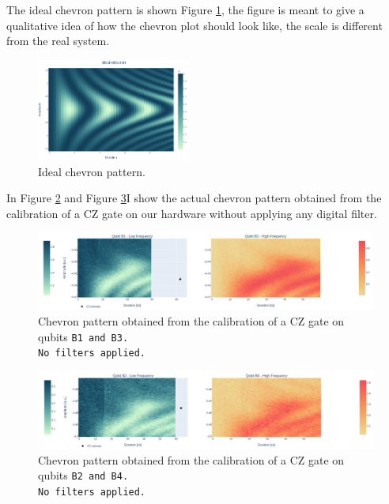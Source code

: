 The ideal chevron pattern is shown Figure \ref{fig:expected_chevron}, the figure is meant to give a qualitative idea of how the chevron plot should look like, the scale is different from the real system.

\begin{figure}[h!]
    \centering
    \includegraphics[width=0.45\textwidth]{figures/png/IdealChevron.png}
    \caption{Ideal chevron pattern.}
    \label{fig:expected_chevron}
\end{figure}

\newpage
{}
In Figure \ref{fig:B1B3_nofilter} and Figure \ref{fig:B2B4_nofilter}I show the actual chevron pattern obtained from the calibration of a CZ gate on our hardware without applying any digital filter.

\begin{figure}[h!]
    \centering
    \includegraphics[width=\textwidth]{figures/png/Cryoscope/B1B3_nofilter.png}
    \caption{Chevron pattern obtained from the calibration of a CZ gate on qubits \tt{B1} and \tt{B3}.\\ No filters applied.}
    \label{fig:B1B3_nofilter}
\end{figure}

\begin{figure}[h!]
    \centering
    \includegraphics[width=\textwidth]{figures/png/Cryoscope/B2B4_nofilter.png}
    \caption{Chevron pattern obtained from the calibration of a CZ gate on qubits \tt{B2} and \tt{B4}.\\ No filters applied.}
    \label{fig:B2B4_nofilter}
\end{figure}

